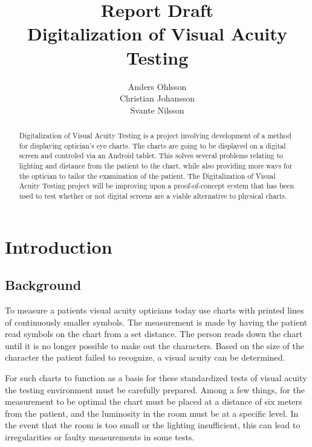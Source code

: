 \documentclass[12pt,a4paper,notitlepage]{report}
\begin{document}

\title{Report Draft\\Digitalization of Visual Acuity Testing}
\author{Anders Ohlsson\\Christian Johansson\\Svante Nilsson}
\maketitle

\begin{abstract}
Digitalization of Visual Acuity Testing is a project involving development of a method for displaying optician's eye charts. The charts are going to be displayed on a digital screen and controled via an Android tablet. This solves several problems relating to lighting and distance from the patient to the chart, while also providing more ways for the optician to tailor the examination of the patient. The Digitalization of Visual Acuity Testing project will be improving upon a proof-of-concept system that has been used to test whether or not digital screens are a viable alternative to physical charts.
\end{abstract}

\tableofcontents
\listoffigures
\clearpage

\setcounter{page}{1}
\chapter{Introduction}
\section{Background}
To measure a patients visual acuity opticians today use charts with printed lines of continuously smaller symbols. The measurement is made by having the patient read symbols on the chart from a set distance. The person reads down the chart until it is no longer possible to make out the characters. Based on the size of the character the patient failed to recognize, a visual acuity can be determined. 

For such charts to function as a basis for these standardized tests of visual acuity the testing environment must be carefully prepared. Among a few things, for the measurement to be optimal the chart must be placed at a distance of six meters from the patient, and the luminosity in the room must be at a specific level. In the event that the room is too small or the lighting insufficient, this can lead to irregularities or faulty measurements in some tests. 
\end{document}

